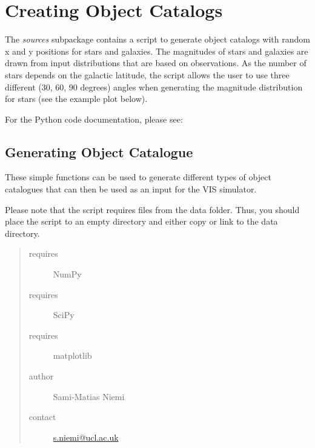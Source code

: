 \documentclass[a4paper,11pt,english]{sphinxmanual}
\begin{document}
\chapter{Creating Object Catalogs}
\label{index:creating-object-catalogs}
The \emph{sources} subpackage contains a script to generate object catalogs with random x and y positions for
stars and galaxies. The magnitudes of stars and galaxies are drawn from input distributions that are
based on observations. As the number of stars depends on the galactic latitude, the script allows
the user to use three different (30, 60, 90 degrees) angles when generating the magnitude distribution for stars
(see the example plot below).

For the Python code documentation, please see:
\label{sources:module-sources.createObjectCatalogue}

\section{Generating Object Catalogue}
\label{sources::doc}\label{sources:generating-object-catalogue}
These simple functions can be used to generate different types of object catalogues that can then be used
as an input for the VIS simulator.

Please note that the script requires files from the data folder. Thus, you should
place the script to an empty directory and either copy or link to the data directory.
\begin{quote}\begin{description}
\item[{requires}] \leavevmode
NumPy

\item[{requires}] \leavevmode
SciPy

\item[{requires}] \leavevmode
matplotlib

\item[{author}] \leavevmode
Sami-Matias Niemi

\item[{contact}] \leavevmode
\href{mailto:s.niemi@ucl.ac.uk}{s.niemi@ucl.ac.uk}

\end{description}\end{quote}
\end{document}

